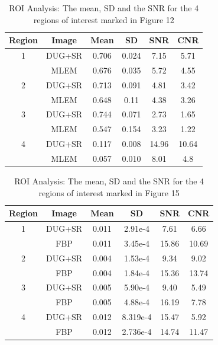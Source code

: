 \begin{table}[h!]
	\centering
	\caption{ROI Analysis: The mean, \ac{SD} and the \ac{SNR} for the 4 regions of interest marked in Figure 12}
	\label{table:5}
	\begin{tabular}{||c|c|c|c|c|c||} 
		\hline
		Region & Image & Mean & \ac{SD} & \ac{SNR} & \ac{CNR} \\ [0.5ex] 
		\hline\hline
		1   &    DUG+SR   & 0.706 & 0.024  & 7.15 & 5.71 \\ 
		
		&    MLEM   &    0.676  &  0.035  & 5.72 & 4.55 \\ 
		\hline
		2  &    DUG+SR   & 0.713     &  0.091  & 4.81  & 3.42\\ 
		
		&     MLEM      & 0.648 & 0.11 & 4.38 & 3.26\\ 
		\hline
		3  &    DUG+SR &   0.744  & 0.071 & 2.73 & 1.65\\  
		
		&    MLEM   &    0.547 & 0.154 & 3.23 & 1.22\\ 
		\hline
		4  &    DUG+SR   &    0.117 & 0.008 & 14.96 & 10.64\\  
		
		&    MLEM       &    0.057 & 0.010 & 8.01 & 4.8\\  
		\hline
	\end{tabular}
	
\end{table}

\begin{table}[h!]
	\centering
	\caption{ROI Analysis: The mean, \ac{SD} and the \ac{SNR} for the 4 regions of interest marked in Figure 15}
	\label{table:6}
	\begin{tabular}{||c|c|c|c|c|c||} 
		\hline
		Region & Image & Mean & \ac{SD} & \ac{SNR} & \ac{CNR} \\ [0.5ex] 
		\hline\hline
		1   &    DUG+SR   & 0.011 & 2.91e-4  & 7.61 & 6.66 \\ 
		
		&    FBP   &    0.011  &  3.45e-4  & 15.86 & 10.69 \\ 
		\hline
		2  &    DUG+SR   & 0.004     &  1.53e-4  & 9.34  & 9.02\\ 
		
		&     FBP   & 0.004 &  1.84e-4 & 15.36 & 13.74\\ 
		\hline
		3  &    DUG+SR &   0.005  & 5.90e-4 & 9.40 & 5.49\\  
		
		&    FBP    &    0.005 & 4.88e-4 &  16.19 &  7.78\\ 
		\hline
		4  &    DUG+SR   &    0.012 & 8.319e-4 & 15.47 & 5.92\\  
		
		&    FBP       &    0.012 &  2.736e-4 & 14.74 & 11.47\\  
		\hline
	\end{tabular}
	
\end{table}



